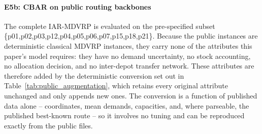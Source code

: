 \documentclass[authoryear,final,3p,times]{elsarticle}
\theoremstyle{definition}
\theoremstyle{plain}
\begin{document}
\paragraph{E5b: CBAR on public routing backbones}
The complete IAR-MDVRP is evaluated on the pre-specified subset
\{p01,p02,p03,p12,p04,p05,p06,p07,p15,p18,p21\}.  Because the public
instances are deterministic classical MDVRP instances, they carry none of
the attributes this paper's model requires: they have no demand
uncertainty, no stock accounting, no allocation decision, and no inter-depot
transfer network.  These attributes are therefore added by the deterministic
conversion set out in Table~\ref{tab:public_augmentation}, which retains
every original attribute unchanged and only appends new ones.  The
conversion is a function of published data alone -- coordinates, mean
demands, capacities, and, where parseable, the published best-known route --
so it involves no tuning and can be reproduced exactly from the public files.
\end{document}

